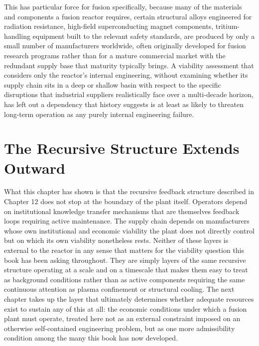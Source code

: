 This has particular force for fusion specifically, because many of the materials and components a fusion reactor requires, certain structural alloys engineered for radiation resistance, high-field superconducting magnet components, tritium-handling equipment built to the relevant safety standards, are produced by only a small number of manufacturers worldwide, often originally developed for fusion research programs rather than for a mature commercial market with the redundant supply base that maturity typically brings. A viability assessment that considers only the reactor's internal engineering, without examining whether its supply chain sits in a deep or shallow basin with respect to the specific disruptions that industrial suppliers realistically face over a multi-decade horizon, has left out a dependency that history suggests is at least as likely to threaten long-term operation as any purely internal engineering failure.

\section{The Recursive Structure Extends Outward}

What this chapter has shown is that the recursive feedback structure described in Chapter 12 does not stop at the boundary of the plant itself. Operators depend on institutional knowledge transfer mechanisms that are themselves feedback loops requiring active maintenance. The supply chain depends on manufacturers whose own institutional and economic viability the plant does not directly control but on which its own viability nonetheless rests. Neither of these layers is external to the reactor in any sense that matters for the viability question this book has been asking throughout. They are simply layers of the same recursive structure operating at a scale and on a timescale that makes them easy to treat as background conditions rather than as active components requiring the same continuous attention as plasma confinement or structural cooling. The next chapter takes up the layer that ultimately determines whether adequate resources exist to sustain any of this at all: the economic conditions under which a fusion plant must operate, treated here not as an external constraint imposed on an otherwise self-contained engineering problem, but as one more admissibility condition among the many this book has now developed.
